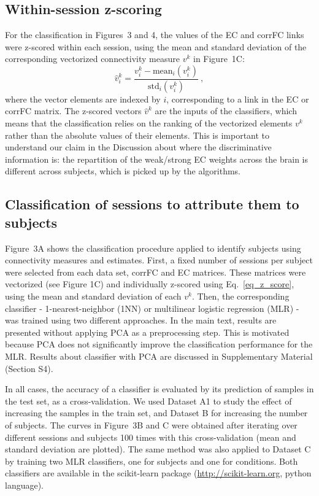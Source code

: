 \documentclass{article}
\begin{document}
\subsection{Within-session z-scoring}

For the classification in Figures~3 and 4, the values of the EC and corrFC links were z-scored within each session, using the mean and standard deviation of the corresponding vectorized connectivity measure $v^k$ in Figure~1C:
\begin{equation} \label{eq_z_score}
\hat{v}^k_i = \frac{v^k_i - \mathrm{mean}_i(v^k_i)}{\mathrm{std}_i(v^k_i)}
\ ,
\end{equation}
where the vector elements are indexed by $i$, corresponding to a link in the EC or corrFC matrix.
The z-scored vectors $\hat{v}^k$ are the inputs of the classifiers, which means that the classification relies on the ranking of the vectorized elements $v^k$ rather than the absolute values of their elements. This is important to understand our claim in the Discussion about where the discriminative information is: the repartition of the weak/strong EC weights across the brain is different across subjects, which is picked up by the algorithms.

\subsection{Classification of sessions to attribute them to subjects}

Figure~3A shows the classification procedure applied to identify subjects using connectivity measures and estimates. First, a fixed number of sessions per subject were selected from each data set, corrFC and EC matrices. These matrices were vectorized (see Figure 1C) and individually z-scored using Eq.~\eqref{eq_z_score}, using the mean and standard deviation of each $v^k$. Then, the corresponding classifier - 1-nearest-neighbor (1NN) or multilinear logistic regression (MLR) - was trained using two different approaches. 
In the main text, results are presented without applying PCA as a preprocessing step. This is motivated because PCA does not significantly improve the classification performance for the MLR. Results about classifier with PCA are discussed in Supplementary Material (Section S4).

In all cases, the accuracy of a classifier is evaluated by its prediction of samples in the test set, as a cross-validation.
We used Dataset A1 to study the effect of increasing the samples in the train set, and Dataset B for increasing the number of subjects. The curves in Figure~3B and C were obtained after iterating over different sessions and subjects 100 times with this cross-validation (mean and standard deviation are plotted).
The same method was also applied to Dataset C by training two MLR classifiers, one for subjects and one for conditions. 
Both classifiers are available in the scikit-learn package (\url{http://scikit-learn.org}, python language).
\end{document}
